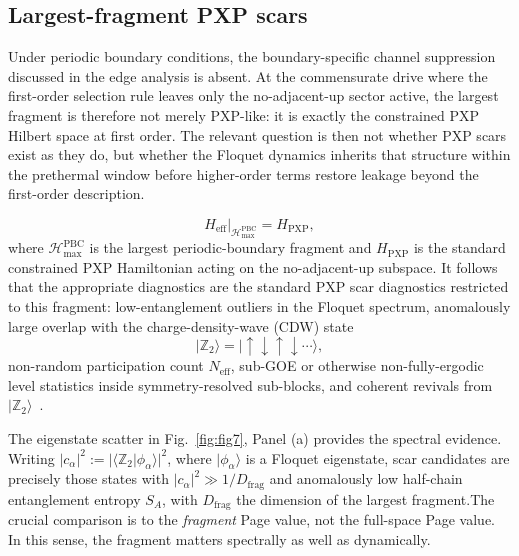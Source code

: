 \documentclass[aps,prb,reprint,twocolumn,amsmath,amssymb,citeautoscript]{revtex4-2}
\begin{document}
\subsection{Largest-fragment PXP scars}
\label{sec:scars}

Under periodic boundary conditions, the boundary-specific channel suppression discussed in the edge analysis is absent. At the commensurate drive where the first-order selection rule leaves only the no-adjacent-up sector active, the largest fragment is therefore not merely PXP-like: it is exactly the constrained PXP Hilbert space at first order. The relevant question is then not whether PXP scars exist as they do, but whether the Floquet dynamics inherits that structure within the prethermal window before higher-order terms restore leakage beyond the first-order description.

\begin{equation}
H_{\mathrm{eff}}\big|_{\mathcal{H}^{\mathrm{PBC}}_{\max}} = H_{\mathrm{PXP}},
\label{eq:Heff_PXP_restricted}
\end{equation}
where $\mathcal{H}^{\mathrm{PBC}}_{\max}$ is the largest periodic-boundary fragment and $H_{\mathrm{PXP}}$ is the standard constrained PXP Hamiltonian acting on the no-adjacent-up subspace. It follows that the appropriate diagnostics are the standard PXP scar diagnostics restricted to this fragment: low-entanglement outliers in the Floquet spectrum, anomalously large overlap with the charge-density-wave (CDW) state
\[
|\mathbb{Z}_2\rangle = |\uparrow\downarrow\uparrow\downarrow\cdots\rangle,
\]
non-random participation count $N_{\mathrm{eff}}$, sub-GOE or otherwise non-fully-ergodic level statistics inside symmetry-resolved sub-blocks, and coherent revivals from $|\mathbb{Z}_2\rangle$~\cite{FendleySenguptaSachdev2004PRB,Bernien2017Nature,Turner2018NatPhys,Mukherjee2020PRBFloquetScars,MizutaTakasanKawakami2020PRResearch,SugiuraKuwaharaSaito2021PRResearch,HudomalDesaulesMukherjeeSuHalimehPapic2022PRB,Giudici2024PRL,PaiPretko2019PRL,Ghosh2026arXiv}.

The eigenstate scatter in Fig.~\ref{fig:fig7}, Panel (a) provides the spectral evidence. Writing
$|c_\alpha|^2 := |\langle \mathbb{Z}_2|\phi_\alpha\rangle|^2$, where
$|\phi_\alpha\rangle$ is a Floquet eigenstate, scar candidates are precisely those states with
$|c_\alpha|^2 \gg 1/D_{\mathrm{frag}}$ and anomalously low half-chain entanglement entropy $S_A$, with
$D_{\mathrm{frag}}$ the dimension of the largest fragment.The crucial comparison is to the \textit{fragment} Page value, not the full-space Page value. In this sense, the fragment matters spectrally as well as dynamically.
\end{document}
